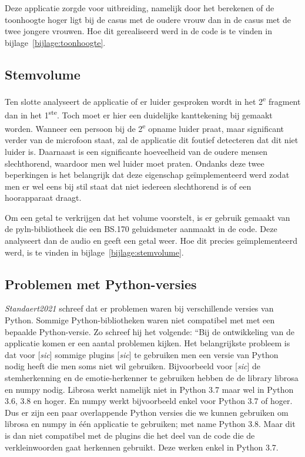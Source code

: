 Deze applicatie zorgde voor uitbreiding, namelijk door het berekenen of de toonhoogte hoger ligt bij de casus met de oudere vrouw dan in de casus met de twee jongere vrouwen.
Hoe dit gerealiseerd werd in de code is te vinden in bijlage~\ref{bijlage:toonhoogte}.

\subsection{Stemvolume}
Ten slotte analyseert de applicatie of er luider gesproken wordt in het 2\textsuperscript{e} fragment dan in het 1\textsuperscript{ste}. Toch moet er hier een duidelijke kanttekening bij gemaakt worden. Wanneer een persoon bij de 2\textsuperscript{e} opname luider praat, maar significant verder van de microfoon staat, zal de applicatie dit foutief detecteren  dat dit niet luider is. Daarnaast is een significante hoeveelheid van de oudere mensen slechthorend, waardoor men wel luider moet praten. Ondanks deze twee beperkingen is het belangrijk dat deze eigenschap geïmplementeerd werd zodat men er wel eens bij stil staat dat niet iedereen slechthorend is of een hoorapparaat draagt.

Om een getal te verkrijgen dat het volume voorstelt, is er gebruik gemaakt van de pyln-bibliotheek die een BS.170 geluidsmeter aanmaakt in de code. Deze analyseert dan de audio en geeft een getal weer. Hoe dit precies geïmplementeerd werd, is te vinden in bijlage~\ref{bijlage:stemvolume}.

\subsection{Problemen met Python-versies}
\textit{Standaert2021} schreef dat er problemen waren bij verschillende versies van Python. Sommige Python-bibliotheken waren niet compatibel met met een bepaalde Python-versie. Zo schreef hij het volgende:
``Bij de ontwikkeling van de applicatie komen er een aantal problemen kijken. Het belangrijkste
probleem is dat voor [\textit{sic}] sommige plugins [\textit{sic}] te gebruiken men een versie van Python
nodig heeft die men soms niet wil gebruiken. Bijvoorbeeld voor [\textit{sic}] de stemherkenning en
de emotie-herkenner te gebruiken hebben de de library librosa en numpy nodig. Librosa
werkt namelijk niet in Python 3.7 maar wel in Python 3.6, 3.8 en hoger. En numpy werkt
bijvoorbeeld enkel voor Python 3.7 of hoger. Dus er zijn een paar overlappende Python
versies die we kunnen gebruiken om librosa en numpy in één applicatie te gebruiken; met
name Python 3.8. Maar dit is dan niet compatibel met de plugins die het deel van de code
die de verkleinwoorden gaat herkennen gebruikt. Deze werken enkel in Python 3.7.

